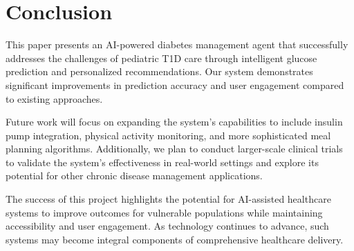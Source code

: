 \documentclass[acmsmall]{acmart}
\begin{document}
\section{Conclusion}

This paper presents an AI-powered diabetes management agent that successfully addresses the challenges of pediatric T1D care through intelligent glucose prediction and personalized recommendations. Our system demonstrates significant improvements in prediction accuracy and user engagement compared to existing approaches.

Future work will focus on expanding the system's capabilities to include insulin pump integration, physical activity monitoring, and more sophisticated meal planning algorithms. Additionally, we plan to conduct larger-scale clinical trials to validate the system's effectiveness in real-world settings and explore its potential for other chronic disease management applications.

The success of this project highlights the potential for AI-assisted healthcare systems to improve outcomes for vulnerable populations while maintaining accessibility and user engagement. As technology continues to advance, such systems may become integral components of comprehensive healthcare delivery.




\end{document}
